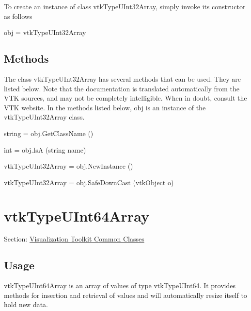 To create an instance of class vtk\-Type\-U\-Int32\-Array, simply invoke its constructor as follows \begin{DoxyVerb}  obj = vtkTypeUInt32Array
\end{DoxyVerb}
 \hypertarget{vtkwidgets_vtkxyplotwidget_Methods}{}\subsection{Methods}\label{vtkwidgets_vtkxyplotwidget_Methods}
The class vtk\-Type\-U\-Int32\-Array has several methods that can be used. They are listed below. Note that the documentation is translated automatically from the V\-T\-K sources, and may not be completely intelligible. When in doubt, consult the V\-T\-K website. In the methods listed below, {\ttfamily obj} is an instance of the vtk\-Type\-U\-Int32\-Array class. 
\begin{DoxyItemize}
\item {\ttfamily string = obj.\-Get\-Class\-Name ()}  
\item {\ttfamily int = obj.\-Is\-A (string name)}  
\item {\ttfamily vtk\-Type\-U\-Int32\-Array = obj.\-New\-Instance ()}  
\item {\ttfamily vtk\-Type\-U\-Int32\-Array = obj.\-Safe\-Down\-Cast (vtk\-Object o)}  
\end{DoxyItemize}\hypertarget{vtkcommon_vtktypeuint64array}{}\section{vtk\-Type\-U\-Int64\-Array}\label{vtkcommon_vtktypeuint64array}
Section\-: \hyperlink{sec_vtkcommon}{Visualization Toolkit Common Classes} \hypertarget{vtkwidgets_vtkxyplotwidget_Usage}{}\subsection{Usage}\label{vtkwidgets_vtkxyplotwidget_Usage}
vtk\-Type\-U\-Int64\-Array is an array of values of type vtk\-Type\-U\-Int64. It provides methods for insertion and retrieval of values and will automatically resize itself to hold new data.

